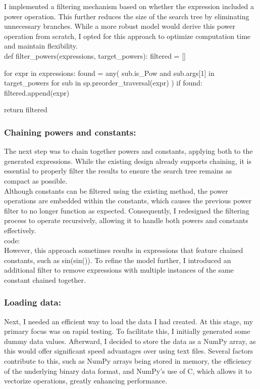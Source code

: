 \documentclass{article}
\begin{document}
I implemented a filtering mechanism based on whether the expression included a power operation. This further reduces the size of the search tree by eliminating unnecessary branches. While a more robust model would derive this power operation from scratch, I opted for this approach to optimize computation time and maintain flexibility.\\

def filter_powers(expressions, target_powers):
    filtered = []

    for expr in expressions:
        found = any(
            sub.is_Pow and sub.args[1] in target_powers
            for sub in sp.preorder_traversal(expr)
        )
        if found:
            filtered.append(expr)

    return filtered






\subsubsection{Chaining powers and constants:}

The next step was to chain together powers and constants, applying both to the generated expressions. While the existing design already supports chaining, it is essential to properly filter the results to ensure the search tree remains as compact as possible.\\

Although constants can be filtered using the existing method, the power operations are embedded within the constants, which causes the previous power filter to no longer function as expected. Consequently, I redesigned the filtering process to operate recursively, allowing it to handle both powers and constants effectively.\\


code: \\

However, this approach sometimes results in expressions that feature chained constants, such as sin(sin()). To refine the model further, I introduced an additional filter to remove expressions with multiple instances of the same constant chained together.\\


\subsubsection{Loading data:}

Next, I needed an efficient way to load the data I had created. At this stage, my primary focus was on rapid testing. To facilitate this, I initially generated some dummy data values. Afterward, I decided to store the data as a NumPy array, as this would offer significant speed advantages over using text files. Several factors contribute to this, such as NumPy arrays being stored in memory, the efficiency of the underlying binary data format, and NumPy's use of C, which allows it to vectorize operations, greatly enhancing performance.\\
\end{document}
